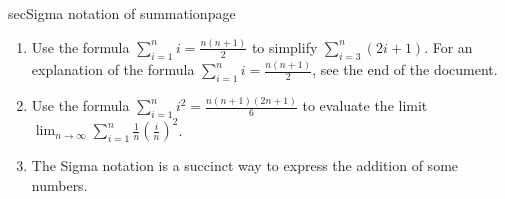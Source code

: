 \documentclass[../main]{subfiles}
\begin{document}
\begin{outline}{sec}{Sigma notation of summation}{page}
\begin{enumerate}
    \item Use the formula \(\sum_{i=1}^{n} i = \frac{n(n+1)}{2}\) to simplify \(\sum_{i=3}^{n} (2i+1)\). For an explanation of the formula \(\sum_{i=1}^{n} i = \frac{n(n+1)}{2}\), see the end of the document.

    \item Use the formula \(\sum_{i=1}^{n} i^{2} = \frac{n(n+1)(2n+1)}{6}\) to evaluate the limit \(\lim_{n \to \infty} \sum_{i=1}^{n} \frac{1}{n} \left( \frac{i}{n} \right)^{2}\). %


    \item {The Sigma notation is a succinct way to express the addition of some numbers.}
  \end{enumerate}
\end{outline}
\end{document}

